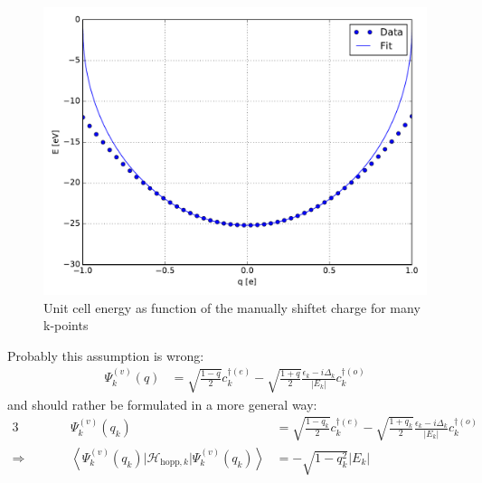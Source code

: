 \begin{figure}
\centering
\includegraphics[width = \textwidth]{Images/CDFT/cdft_energy_many_kpts.pdf}
\caption[Unit cell energy as function of the manually shiftet charge for many k-points]{Unit cell energy as function of the manually shiftet charge for many k-points}
\label{image_cdft_many_kpts}
\end{figure}
Probably this assumption is wrong:
\begin{align}
	\Psi_k^{(v)}(q) &= \sqrt{\frac{1-q}{2}}c_k^{\dagger(e)}- \sqrt{\frac{1+q}{2}}\frac{\epsilon_k - i \Delta_k}{|E_k|}c_{k}^{\dagger(o)}
\end{align}
and should rather be formulated in a more general way:
\begin{alignat}{3}
	&&\Psi_k^{(v)}(q_k) &= \sqrt{\frac{1-q_k}{2}}c_k^{\dagger(e)}- \sqrt{\frac{1+q_k}{2}}\frac{\epsilon_k - i \Delta_k}{|E_k|}c_{k}^{\dagger(o)}\\
\Rightarrow&\qquad&\left\langle\Psi_k^{(v)}(q_k)\Big|\mathcal{H}_{\text{hopp},k}\Big|\Psi_k^{(v)}(q_k)\right\rangle &= -\sqrt{1-q^2_k} |E_k|
\end{alignat}
\newpage

